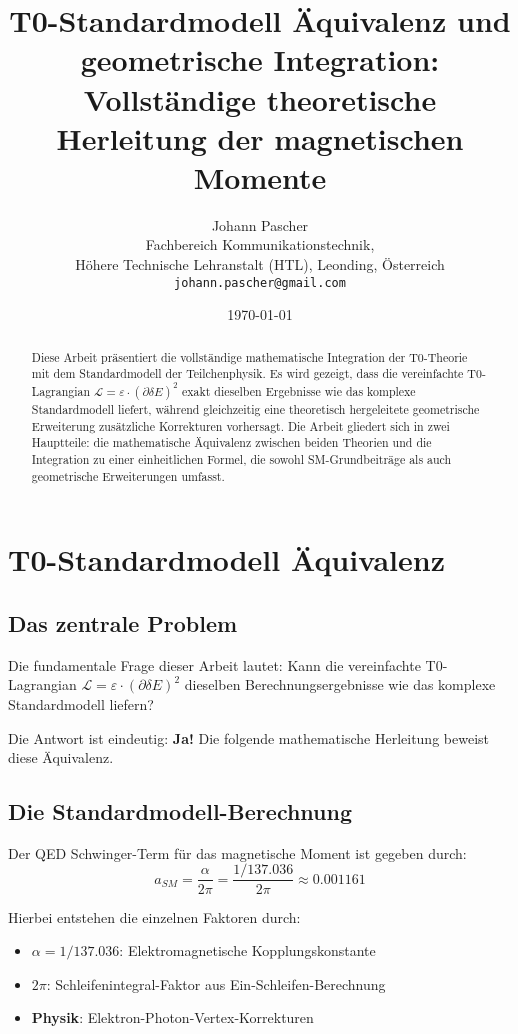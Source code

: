 \documentclass[12pt,a4paper]{article}
\title{T0-Standardmodell Äquivalenz und geometrische Integration:\\
	Vollständige theoretische Herleitung der magnetischen Momente}
\author{Johann Pascher\\
	Fachbereich Kommunikationstechnik,\\
	Höhere Technische Lehranstalt (HTL), Leonding, Österreich\\
	\texttt{johann.pascher@gmail.com}}
\date{\today}
\numberwithin{equation}{section}
\newcommand{\calL}{\mathcal{L}}
\begin{document}
	
	\maketitle
	
	\begin{abstract}
		Diese Arbeit präsentiert die vollständige mathematische Integration der T0-Theorie mit dem Standardmodell der Teilchenphysik. Es wird gezeigt, dass die vereinfachte T0-Lagrangian $\calL = \varepsilon \cdot (\partial \delta E)^2$ exakt dieselben Ergebnisse wie das komplexe Standardmodell liefert, während gleichzeitig eine theoretisch hergeleitete geometrische Erweiterung zusätzliche Korrekturen vorhersagt. Die Arbeit gliedert sich in zwei Hauptteile: die mathematische Äquivalenz zwischen beiden Theorien und die Integration zu einer einheitlichen Formel, die sowohl SM-Grundbeiträge als auch geometrische Erweiterungen umfasst.
	\end{abstract}
	
	\tableofcontents
	\newpage
	
	\section{T0-Standardmodell Äquivalenz}
	
	\subsection{Das zentrale Problem}
	
	Die fundamentale Frage dieser Arbeit lautet: Kann die vereinfachte T0-Lagrangian $\calL = \varepsilon \cdot (\partial \delta E)^2$ dieselben Berechnungsergebnisse wie das komplexe Standardmodell liefern?
	
	Die Antwort ist eindeutig: \textbf{Ja!} Die folgende mathematische Herleitung beweist diese Äquivalenz.
	
	\subsection{Die Standardmodell-Berechnung}
	
	Der QED Schwinger-Term für das magnetische Moment ist gegeben durch:
	\begin{equation}
		\label{eq:schwinger_sm}
		a_{SM} = \frac{\alpha}{2\pi} = \frac{1/137.036}{2\pi} \approx 0.001161
	\end{equation}
	
	Hierbei entstehen die einzelnen Faktoren durch:
	\begin{itemize}
		\item $\alpha = 1/137.036$: Elektromagnetische Kopplungskonstante
		\item $2\pi$: Schleifenintegral-Faktor aus Ein-Schleifen-Berechnung
		\item \textbf{Physik}: Elektron-Photon-Vertex-Korrekturen
	\end{itemize}
	
\end{document}
